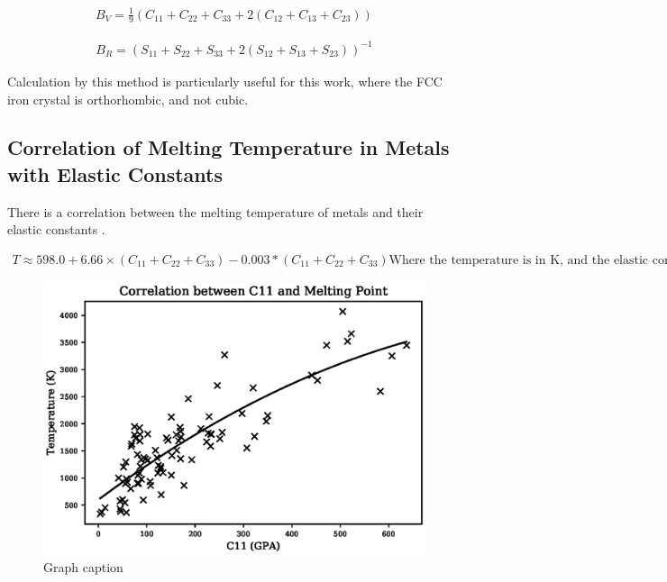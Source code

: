 \begin{equation}
\begin{split}
B_{V} = \frac{1}{9} \left( C_{11} + C_{22} + C_{33} + 2(C_{12} + C_{13} + C_{23}) \right)
\end{split}
\label{eq:eqLennardJones}
\end{equation}

\begin{equation}
\begin{split}
B_{R} = \left( S_{11} + S_{22} + S_{33} + 2(S_{12} + S_{13} + S_{23}) \right)^{-1}
\end{split}
\label{eq:eqLennardJones}
\end{equation}

Calculation by this method is particularly useful for this work, where the FCC iron crystal is orthorhombic, and not cubic.







\subsection{Correlation of Melting Temperature in Metals with Elastic Constants}

There is a correlation between the melting temperature of metals and their elastic constants \cite{ElasticMeltingTemp}.  

\begin{equation}
\begin{split}
T \approx 598.0 + 6.66 \times (C_{11} + C_{22} + C_{33}) - 0.003 * (C_{11} + C_{22} + C_{33})
\text{Where the temperature is in K, and the elastic constants are in GPA}
\end{split}
\label{eq:eqLennardJones}
\end{equation}

\begin{figure}[htbp]
  \begin{center}
    \includegraphics{chapters/background_potential_fitting/plots/c11_temperature}%
    \caption{Graph caption}
    \label{graph:graph1}
  \end{center}
\end{figure}

